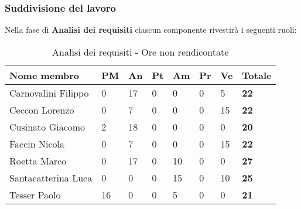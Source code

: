 		\subsubsection{Suddivisione del lavoro} %
		\label{ssub:suddivisione_del_lavoro}
		Nella fase di \textbf{Analisi dei requisiti} ciascun componente rivestirà i seguenti ruoli: \\
			\begin{table}[!htt]
				\begin{center}
					\begin{tabularx}{0.9\textwidth}{|l|l|l|l|l|l|l|X|}
						\hline
						\textbf{Nome membro} & \textbf{PM} & \textbf{An} & \textbf{Pt} & \textbf{Am} & \textbf{Pr} & \textbf{Ve} & \textbf{Totale} \\
						\hline
						Carnovalini Filippo & 0 & 17 & 0 & 0 & 0 & 5 & \textbf{22} \\
						\hline
						Ceccon Lorenzo & 0 & 7 & 0 & 0 & 0 & 15 & \textbf{22} \\
						\hline
						Cusinato Giacomo & 2 & 18 & 0 & 0 & 0 & 0 & \textbf{20} \\
						\hline
						Faccin Nicola & 0 & 7 & 0 & 0 & 0 & 15 & \textbf{22} \\
						\hline
						Roetta Marco & 0 & 17 & 0 & 10 & 0 & 0 & \textbf{27} \\
						\hline
						Santacatterina Luca & 0 & 0 & 0 & 15 & 0 & 10 & \textbf{25} \\
						\hline
						Tesser Paolo & 16 & 0 & 0 & 5 & 0 & 0 & \textbf{21} \\
						\hline		
					\end{tabularx}
				\end{center}
			\caption{Analisi dei requisiti - Ore non rendicontate}
			\end{table}
			
